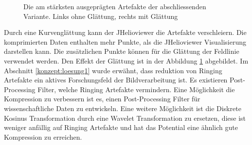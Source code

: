 \begin{figure}[!htbp]
	\center
	\caption{Die am stärksten ausgeprägten Artefakte der abschliessenden Variante. Links ohne Glättung, rechts mit Glättung}
	\label{resultate:loesung1:dct:final:artefakte}
\end{figure}
Durch eine Kurvenglättung kann der JHelioviewer die Artefakte verschleiern. Die komprimierten Daten enthalten mehr Punkte, als die JHelioviewer Visualisierung darstellen kann. Die zusätzlichen Punkte können für die Glättung der Feldlinie verwendet werden. Den Effekt der Glättung ist in der Abbildung \ref{resultate:loesung1:dct:final:artefakte} abgebildet.
Im Abschnitt \ref{konzept:loesung1} wurde erwähnt, dass reduktion von Ringing Artefakte ein aktives Forschungsfeld der Bildverarbeitung ist. Es existieren Post-Processing Filter, welche Ringing Artefakte vermindern. Eine Möglichkeit die Kompression zu verbessern ist es, einen Post-Processing Filter für wissenschaftliche Daten zu entwickeln. Eine weitere Möglichkeit ist die Diskrete Kosinus Transformation durch eine Wavelet Transformation zu ersetzen, diese ist weniger anfällig auf Ringing Artefakte und hat das Potential eine ähnlich gute Kompression zu erreichen.
\pagebreak
